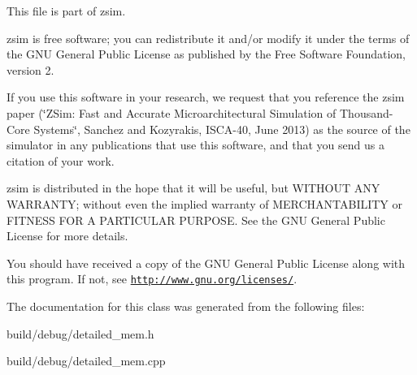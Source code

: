 This file is part of zsim.

zsim is free software; you can redistribute it and/or modify it under the terms of the G\-N\-U General Public License as published by the Free Software Foundation, version 2.

If you use this software in your research, we request that you reference the zsim paper (\char`\"{}\-Z\-Sim\-: Fast and Accurate Microarchitectural Simulation of
\-Thousand-\/\-Core Systems\char`\"{}, Sanchez and Kozyrakis, I\-S\-C\-A-\/40, June 2013) as the source of the simulator in any publications that use this software, and that you send us a citation of your work.

zsim is distributed in the hope that it will be useful, but W\-I\-T\-H\-O\-U\-T A\-N\-Y W\-A\-R\-R\-A\-N\-T\-Y; without even the implied warranty of M\-E\-R\-C\-H\-A\-N\-T\-A\-B\-I\-L\-I\-T\-Y or F\-I\-T\-N\-E\-S\-S F\-O\-R A P\-A\-R\-T\-I\-C\-U\-L\-A\-R P\-U\-R\-P\-O\-S\-E. See the G\-N\-U General Public License for more details.

You should have received a copy of the G\-N\-U General Public License along with this program. If not, see \href{http://www.gnu.org/licenses/}{\tt http\-://www.\-gnu.\-org/licenses/}. 

The documentation for this class was generated from the following files\-:\begin{DoxyCompactItemize}
\item 
build/debug/detailed\-\_\-mem.\-h\item 
build/debug/detailed\-\_\-mem.\-cpp\end{DoxyCompactItemize}
